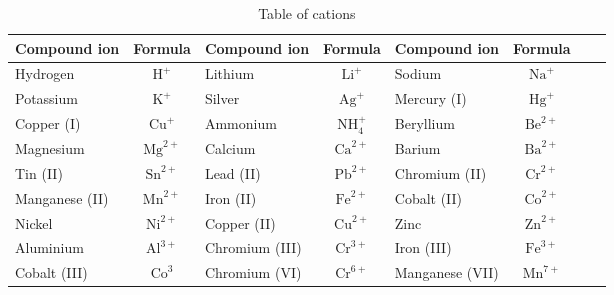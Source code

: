 \begin{enumerate}[noitemsep, label=\textbf{\arabic*}. ]
      
\begin{table}
\begin{center}
\label{tab:cations}
\begin{tabular}{|l|c|l|c|l|c|l|c|} \hline
\textbf{Compound ion} & \textbf{Formula} & \textbf{Compound ion} & \textbf{Formula} & \textbf{Compound ion} & \textbf{Formula}  \\ \hline
Hydrogen       & $\mathrm{H}^{+}$   & Lithium        & $\mathrm{Li}^{+}$     & Sodium          & $\mathrm{Na}^{+}$  \\ \hline
Potassium      & $\mathrm{K}^{+}$   & Silver         & $\mathrm{Ag}^{+}$     & Mercury (I)     & $\mathrm{Hg}^{+}$  \\ \hline
Copper (I)     & $\mathrm{Cu}^{+}$  & Ammonium       & $\mathrm{NH}_{4}^{+}$ & Beryllium       & $\mathrm{Be}^{2+}$ \\ \hline
Magnesium      & $\mathrm{Mg}^{2+}$ & Calcium        & $\mathrm{Ca}^{2+}$    & Barium          & $\mathrm{Ba}^{2+}$ \\ \hline
Tin (II)       & $\mathrm{Sn}^{2+}$ & Lead (II)      & $\mathrm{Pb}^{2+}$    & Chromium (II)   & $\mathrm{Cr}^{2+}$ \\ \hline
Manganese (II) & $\mathrm{Mn}^{2+}$ & Iron (II)      & $\mathrm{Fe}^{2+}$    & Cobalt (II)     & $\mathrm{Co}^{2+}$ \\ \hline
Nickel         & $\mathrm{Ni}^{2+}$ & Copper (II)    & $\mathrm{Cu}^{2+}$    & Zinc            & $\mathrm{Zn}^{2+}$ \\ \hline
Aluminium      & $\mathrm{Al}^{3+}$ & Chromium (III) & $\mathrm{Cr}^{3+}$    & Iron (III)      & $\mathrm{Fe}^{3+}$ \\ \hline
Cobalt (III)   & $\mathrm{Co}^{3}$  & Chromium (VI)  & $\mathrm{Cr}^{6+}$    & Manganese (VII) & $\mathrm{Mn}^{7+}$ \\ \hline

\end{tabular}

 \end{center}
\caption{Table of cations}
\label{tab:cations}
\end{table}


\end{enumerate}
